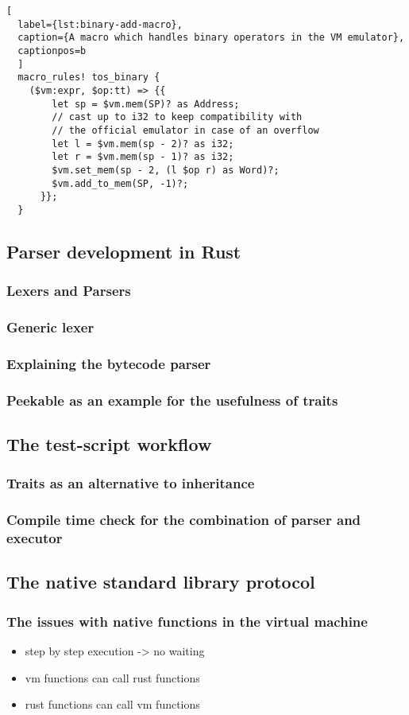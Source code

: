 \begin{lstlisting}[
  label={lst:binary-add-macro},
  caption={A macro which handles binary operators in the VM emulator},
  captionpos=b
  ]
  macro_rules! tos_binary {
    ($vm:expr, $op:tt) => {{
        let sp = $vm.mem(SP)? as Address;
        // cast up to i32 to keep compatibility with
        // the official emulator in case of an overflow
        let l = $vm.mem(sp - 2)? as i32;
        let r = $vm.mem(sp - 1)? as i32;
        $vm.set_mem(sp - 2, (l $op r) as Word)?;
        $vm.add_to_mem(SP, -1)?;
      }};
  }
\end{lstlisting}

\subsection{Parser development in Rust} \label{parser-dev}
\subsubsection{Lexers and Parsers}
\subsubsection{Generic lexer}
\subsubsection{Explaining the bytecode parser}
\subsubsection{Peekable as an example for the usefulness of traits}
\subsection{The test-script workflow}
\subsubsection{Traits as an alternative to inheritance}
\subsubsection{Compile time check for the combination of parser and executor}
\subsection{The native standard library protocol} \label{jack-stdlib-in-rust}
\subsubsection{The issues with native functions in the virtual machine}
\begin{itemize}
  \item step by step execution -> no waiting
  \item vm functions can call rust functions
  \item rust functions can call vm functions
\end{itemize}
